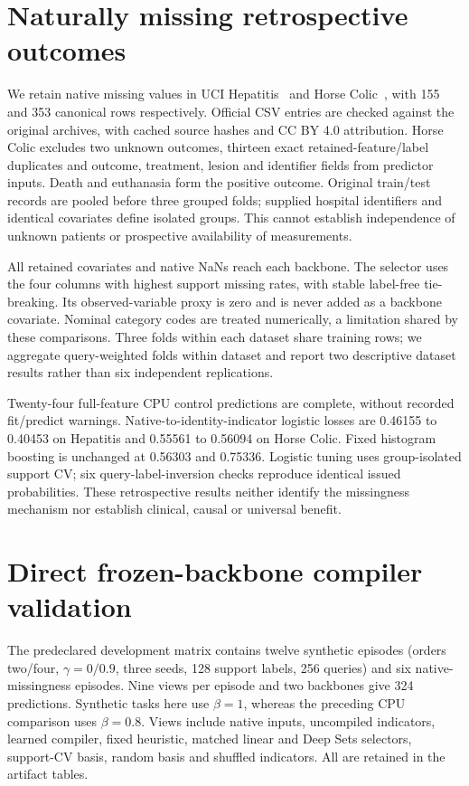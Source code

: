 \documentclass[10pt]{article}
\begin{document}
\section{Naturally missing retrospective outcomes}
We retain native missing values in UCI Hepatitis~\cite{hepatitis} and Horse Colic~\cite{horse}, with 155 and 353 canonical rows respectively. Official CSV entries are checked against the original archives, with cached source hashes and CC BY 4.0 attribution. Horse Colic excludes two unknown outcomes, thirteen exact retained-feature/label duplicates and outcome, treatment, lesion and identifier fields from predictor inputs. Death and euthanasia form the positive outcome. Original train/test records are pooled before three grouped folds; supplied hospital identifiers and identical covariates define isolated groups. This cannot establish independence of unknown patients or prospective availability of measurements.

All retained covariates and native NaNs reach each backbone. The selector uses the four columns with highest support missing rates, with stable label-free tie-breaking. Its observed-variable proxy is zero and is never added as a backbone covariate. Nominal category codes are treated numerically, a limitation shared by these comparisons. Three folds within each dataset share training rows; we aggregate query-weighted folds within dataset and report two descriptive dataset results rather than six independent replications.

Twenty-four full-feature CPU control predictions are complete, without recorded fit/predict warnings. Native-to-identity-indicator logistic losses are 0.46155 to 0.40453 on Hepatitis and 0.55561 to 0.56094 on Horse Colic. Fixed histogram boosting is unchanged at 0.56303 and 0.75336. Logistic tuning uses group-isolated support CV; six query-label-inversion checks reproduce identical issued probabilities. These retrospective results neither identify the missingness mechanism nor establish clinical, causal or universal benefit.

\section{Direct frozen-backbone compiler validation}
The predeclared development matrix contains twelve synthetic episodes (orders two/four, $\gamma=0/0.9$, three seeds, 128 support labels, 256 queries) and six native-missingness episodes. Nine views per episode and two backbones give 324 predictions. Synthetic tasks here use $\beta=1$, whereas the preceding CPU comparison uses $\beta=0.8$. Views include native inputs, uncompiled indicators, learned compiler, fixed heuristic, matched linear and Deep Sets selectors, support-CV basis, random basis and shuffled indicators. All are retained in the artifact tables.
\end{document}
